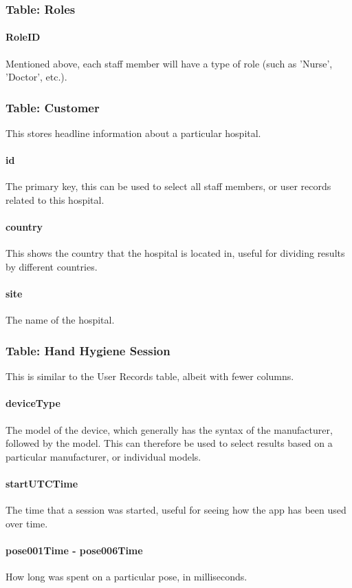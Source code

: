        \subsubsection{Table: Roles}
            \paragraph{RoleID} Mentioned above, each staff member will have a type of role (such as 'Nurse', 'Doctor', etc.).
        \subsubsection{Table: Customer} This stores headline information about a particular hospital.
            \paragraph{id} The primary key, this can be used to select all staff members, or user records related to this hospital.
            \paragraph{country} This shows the country that the hospital is located in, useful for dividing results by different countries.
            \paragraph{site} The name of the hospital.
        \subsubsection{Table: Hand Hygiene Session} This is similar to the User Records table, albeit with fewer columns.
            \paragraph{deviceType} The model of the device, which generally has the syntax of the manufacturer, followed by the model. This can therefore be used to select results based on a particular manufacturer, or individual models.
            \paragraph{startUTCTime} The time that a session was started, useful for seeing how the app has been used over time.
            \paragraph{pose001Time - pose006Time} How long was spent on a particular pose, in milliseconds.
